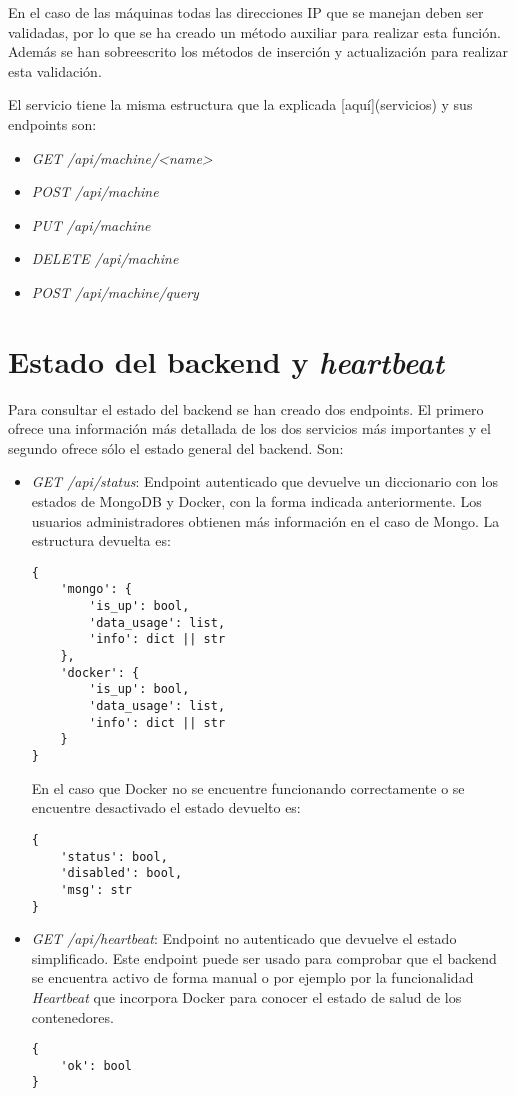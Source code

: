 \bigskip
En el caso de las máquinas todas las direcciones IP que se manejan deben ser validadas, por lo que se ha creado un método auxiliar para realizar esta función. Además se han sobreescrito los métodos de inserción y actualización para realizar esta validación.

\bigskip
El servicio tiene la misma estructura que la explicada [aquí](servicios) y sus endpoints son:
\begin{itemize}
	\item \textit{GET /api/machine/<name>}
	\item \textit{POST /api/machine}
	\item \textit{PUT /api/machine}
	\item \textit{DELETE /api/machine}
	\item \textit{POST /api/machine/query}
\end{itemize}



\section{Estado del backend y \textit{heartbeat}}


Para consultar el estado del backend se han creado dos endpoints. El primero ofrece una información más detallada de los dos servicios más importantes y el segundo ofrece sólo el estado general del backend. Son:
\begin{itemize}
	\item \textit{GET /api/status}: Endpoint autenticado que devuelve un diccionario con los estados de MongoDB y Docker, con la forma indicada anteriormente. Los usuarios administradores obtienen más información en el caso de Mongo. La estructura devuelta es:

\begin{lstlisting}
{
	'mongo': {
		'is_up': bool,
		'data_usage': list,
		'info': dict || str
	},
	'docker': {
		'is_up': bool,
		'data_usage': list,
		'info': dict || str
	}
}
\end{lstlisting}

\bigskip	
En el caso que Docker no se encuentre funcionando correctamente o se encuentre desactivado el estado devuelto es:
	
\begin{lstlisting}
{
	'status': bool,
	'disabled': bool,
	'msg': str
}
\end{lstlisting}
	
	\item \textit{GET /api/heartbeat}: Endpoint no autenticado que devuelve el estado simplificado. Este endpoint puede ser usado para comprobar que el backend se encuentra activo de forma manual o por ejemplo por la funcionalidad \textit{Heartbeat} que incorpora Docker para conocer el estado de salud de los contenedores.
	
\begin{lstlisting}
{
	'ok': bool
}
\end{lstlisting}
\end{itemize}



